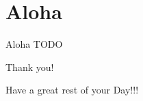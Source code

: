 \documentclass{beamer}
\begin{document}
\section{Aloha}
\begin{frame}[t]{Aloha}
    TODO
\end{frame}
\begin{frame}{Thank you!}
	\begin{center}
        Have a great rest of your Day!!!
	\end{center}
	\begin{center}
	\end{center}
\end{frame}
\end{document}
